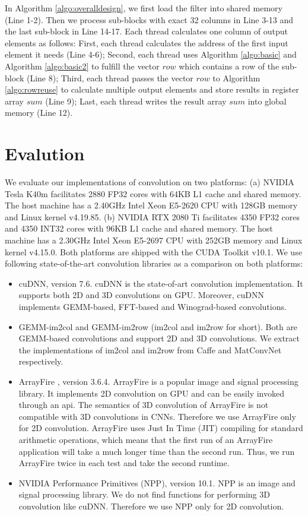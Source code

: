 \documentclass[sigplan,review,anonymous]{acmart}\settopmatter{printfolios=true,printccs=false,printacmref=false}
\begin{document}
In Algorithm \ref{algo:overalldesign}, we first load the filter into shared memory (Line 1-2). Then we process sub-blocks with exact 32 columns in Line 3-13 and the last sub-block in Line 14-17. Each thread calculates one column of output elements as follows: First, each thread calculates the address of the first input element it needs (Line 4-6); Second, each thread uses Algorithm \ref{algo:basic} and Algorithm \ref{algo:basic2} to fulfill the vector $row$ which contains a row of the sub-block (Line 8); Third, each thread passes the vector $row$ to Algorithm \ref{algo:rowreuse} to calculate multiple output elements and store results in register array $sum$ (Line 9); Last, each thread writes the result array $sum$ into global memory (Line 12). 

\section{Evalution}
We evaluate our implementations of convolution on two platforms: (a) NVIDIA Tesla K40m facilitates 2880 FP32 cores with 64KB L1 cache and shared memory. The host machine has a 2.40GHz Intel Xeon E5-2620 CPU with 128GB memory and Linux kernel v4.19.85. (b) NVIDIA RTX 2080 Ti facilitates 4350 FP32 cores and 4350 INT32 cores with 96KB L1 cache and shared memory. The host machine has a 2.30GHz Intel Xeon E5-2697 CPU with 252GB memory and Linux kernel v4.15.0. Both platforms are shipped with the CUDA Toolkit v10.1. We use following state-of-the-art convolution libraries as a comparison on both platforms:
\begin{itemize}
  \item cuDNN, version 7.6. cuDNN is the state-of-art convolution implementation. It supports both 2D and 3D convolutions on GPU. Moreover, cuDNN implements GEMM-based, FFT-based and Winograd-based convolutions.
  \item GEMM-im2col and GEMM-im2row (im2col and im2row for short). Both are GEMM-based convolutions and support 2D and 3D convolutions. We extract the implementations of im2col and im2row from Caffe \cite{jia2014caffe} and MatConvNet \cite{vedaldi15matconvnet} respectively. 
  \item ArrayFire \cite{Yalamanchili2015}, version 3.6.4. ArrayFire is a popular image and signal processing library. It implements 2D convolution on GPU and can be easily invoked through an api. The semantics of 3D convolution of ArrayFire is not compatible with 3D convolutions in CNNs. Therefore we use ArrayFire only for 2D convolution. ArrayFire uses Just In Time (JIT) compiling for standard arithmetic operations, which means that the first run of an ArrayFire application will take a much longer time than the second run. Thus, we run ArrayFire twice in each test and take the second runtime.
  \item NVIDIA Performance Primitives (NPP), version 10.1. NPP is an image and signal processing library. We do not find functions for performing 3D convolution like cuDNN. Therefore we use NPP only for 2D convolution.
 
\end{itemize}
\end{document}
